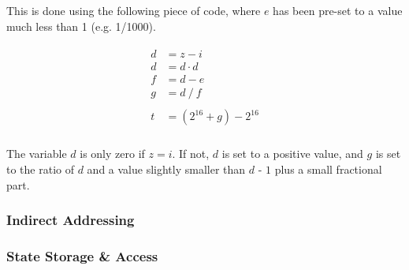 \documentclass[Master.tex]{subfiles}
\begin{document}
This is done using the following piece of code, where $e$ has been pre-set to a value much less than 1 (e.g. 1/1000).

\begin{gather*}
\begin{aligned}
d &= z - i \\
d &= d \cdot d \\
f &= d - e \\
g &= d\ /\ f \\ \\
t &= (2^{16} + g) - 2^{16} \\
\end{aligned}
\end{gather*}

The variable $d$ is only zero if $z = i$. If not, $d$ is set to a positive value, and $g$ is set to the ratio of $d$ and a value slightly smaller than $d$ - $1$ plus a small fractional part.

\subsubsection{Indirect Addressing}

\subsubsection{State Storage \& Access}
\end{document}

